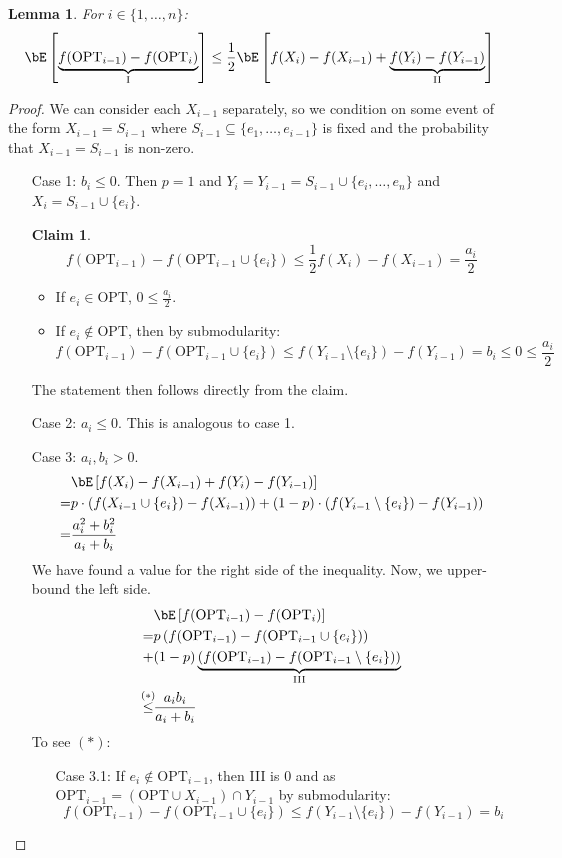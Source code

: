 \documentclass[11pt, a4paper]{article}
\newcommand{\mr}[1]{\mathrm{#1}}
\newcommand{\stackalign}[2]{\stackrel{\mathclap{#1}}{#2}}
\newcommand{\set}[1]{\{#1\}}
\newtheorem{lemma}[theorem]{Lemma}
\newtheorem*{claim}{Claim}
\theoremstyle{remark}
\theoremstyle{definition}
\begin{document}
\begin{lemma}\label{lemma:rand-double-greedy}
	For $i\in\set{1,\ldots,n}$:
	\[\bE\left[\underbrace{f(\mr{OPT}_{i-1})-f(\mr{OPT}_i)}_{\mr{I}}\right]\leq \frac{1}{2}\bE\left[f(X_i)-f(X_{i-1})+\underbrace{f(Y_i)-f(Y_{i-1})}_{\mr{II}}\right]\]
\end{lemma}
\begin{proof}
	We can consider each $X_{i-1}$ separately, so we condition on some event
	of the form $X_{i-1}=S_{i-1}$ where $S_{i-1}\subseteq\set{e_1,\ldots,e_{i-1}}$
	is fixed and the probability that $X_{i-1}=S_{i-1}$ is non-zero.
	\begin{enumerate}
		\item[Case 1:] $b_i\leq 0$. Then $p=1$ and $Y_i=Y_{i-1}=S_{i-1}\cup
		\set{e_i,\ldots,e_n}$ and $X_i=S_{i-1}\cup\set{e_i}$.

		\begin{claim}
			\[f(\mr{OPT}_{i-1})-f(\mr{OPT}_{i-1}\cup\set{e_i})\leq \frac{1}{2}f(X_i)-f(X_{i-1})=\frac{a_i}{2}\]
		\end{claim}
		\begin{itemize}
			\item If $e_i\in\mr{OPT}$, $0\leq \frac{a_i}{2}$.
			\item If $e_i\notin\mr{OPT}$, then by submodularity:
			\[f(\mr{OPT}_{i-1})-f(\mr{OPT}_{i-1}\cup\set{e_i})\leq f(Y_{i-1}\setminus\set{e_i})-f(Y_{i-1})=b_i\leq0\leq\frac{a_i}{2}\]
		\end{itemize}
		The statement then follows directly from the claim.

		\item[Case 2:] $a_i\leq 0$. This is analogous to case 1.
		\item[Case 3:] $a_i,b_i>0$.
		\begin{align*}
			&\bE\left[f(X_i)-f(X_{i-1})+f(Y_i)-f(Y_{i-1})\right] \\
			=&p\cdot\left(f(X_{i-1}\cup\set{e_i})-f(X_{i-1})\right)
			+(1-p)\cdot\left(f(Y_{i-1}\setminus\set{e_i})-f(Y_{i-1})\right) \\
			=&\frac{a_i^2+b_i^2}{a_i+b_i}
		\end{align*}
		We have found a value for the right side of the inequality. Now, we
		upper-bound the left side.
		\begin{align*}
			&\bE\left[f(\mr{OPT}_{i-1})-f(\mr{OPT}_i)\right] \\
			=&p\left(f(\mr{OPT}_{i-1})-f(\mr{OPT}_{i-1}\cup\set{e_i})\right) \\
			+&(1-p)\underbrace{\left(f(\mr{OPT}_{i-1})-f(\mr{OPT}_{i-1}\setminus\set{e_i})\right)}_{\mr{III}} \\
			\stackalign{(*)}{\leq}& \frac{a_ib_i}{a_i+b_i}
		\end{align*}
		To see $(*)$:
		\begin{enumerate}
			\item[Case 3.1:] If $e_i\notin\mr{OPT}_{i-1}$, then III is 0 and as
			$\mr{OPT}_{i-1}=(\mr{OPT}\cup X_{i-1})\cap Y_{i-1}$ by submodularity:
			\[f(\mr{OPT}_{i-1})-f(\mr{OPT}_{i-1}\cup\set{e_i})\leq f(Y_{i-1}\setminus\set{e_i})-f(Y_{i-1})=b_i\]


\end{enumerate}
\end{enumerate}
\end{proof}
\end{document}
